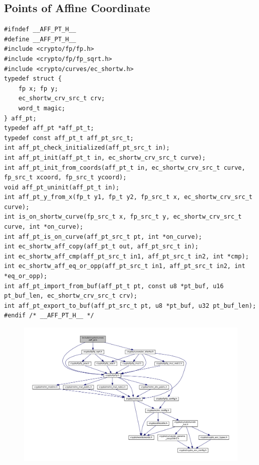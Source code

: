 \subsection{Points of Affine Coordinate}
\begin{lstlisting}[style=cstyle, caption={include/curves/aff\_pt.h}, captionpos=t]
#ifndef __AFF_PT_H__
#define __AFF_PT_H__
#include <crypto/fp/fp.h>
#include <crypto/fp/fp_sqrt.h>
#include <crypto/curves/ec_shortw.h>
typedef struct {
	fp x; fp y; 
	ec_shortw_crv_src_t crv;
	word_t magic;
} aff_pt;
typedef aff_pt *aff_pt_t;
typedef const aff_pt_t aff_pt_src_t;
int aff_pt_check_initialized(aff_pt_src_t in);
int aff_pt_init(aff_pt_t in, ec_shortw_crv_src_t curve);
int aff_pt_init_from_coords(aff_pt_t in, ec_shortw_crv_src_t curve, fp_src_t xcoord, fp_src_t ycoord);
void aff_pt_uninit(aff_pt_t in);
int aff_pt_y_from_x(fp_t y1, fp_t y2, fp_src_t x, ec_shortw_crv_src_t curve);
int is_on_shortw_curve(fp_src_t x, fp_src_t y, ec_shortw_crv_src_t curve, int *on_curve);
int aff_pt_is_on_curve(aff_pt_src_t pt, int *on_curve);
int ec_shortw_aff_copy(aff_pt_t out, aff_pt_src_t in);
int ec_shortw_aff_cmp(aff_pt_src_t in1, aff_pt_src_t in2, int *cmp);
int ec_shortw_aff_eq_or_opp(aff_pt_src_t in1, aff_pt_src_t in2, int *eq_or_opp);
int aff_pt_import_from_buf(aff_pt_t pt, const u8 *pt_buf, u16 pt_buf_len, ec_shortw_crv_src_t crv);
int aff_pt_export_to_buf(aff_pt_src_t pt, u8 *pt_buf, u32 pt_buf_len);
#endif /* __AFF_PT_H__ */

\end{lstlisting}
\begin{figure}[h!]\centering
\includegraphics[scale=.45]{dep-graph/aff_pt.pdf}
\end{figure}
\newpage

